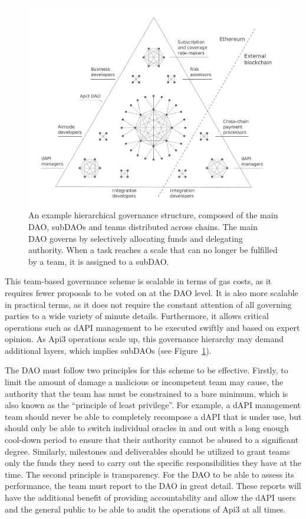 \documentclass[11pt]{article}
\begin{document}
\begin{figure}[t]
    \centering
	\includegraphics[width=\textwidth]{fig/dao/dao}
	\caption{An example hierarchical governance structure, composed of the main DAO, subDAOs and teams distributed across chains.
	The main DAO governs by selectively allocating funds and delegating authority.
	When a task reaches a scale that can no longer be fulfilled by a team, it is assigned to a subDAO.}
	\label{fig:dao}
\end{figure}

This team-based governance scheme is scalable in terms of gas costs, as it requires fewer proposals to be voted on at the DAO level.
It is also more scalable in practical terms, as it does not require the constant attention of all governing parties to a wide variety of minute details.
Furthermore, it allows critical operations such as dAPI management to be executed swiftly and based on expert opinion.
As Api3 operations scale up, this governance hierarchy may demand additional layers, which implies subDAOs (see Figure~\ref{fig:dao}).

The DAO must follow two principles for this scheme to be effective.
Firstly, to limit the amount of damage a malicious or incompetent team may cause, the authority that the team has must be constrained to a bare minimum, which is also known as the ``principle of least privilege''.
For example, a dAPI management team should never be able to completely recompose a dAPI that is under use, but should only be able to switch individual oracles in and out with a long enough cool-down period to ensure that their authority cannot be abused to a significant degree.
Similarly, milestones and deliverables should be utilized to grant teams only the funds they need to carry out the specific responsibilities they have at the time.
The second principle is transparency.
For the DAO to be able to assess its performance, the team must report to the DAO in great detail.
These reports will have the additional benefit of providing accountability and allow the dAPI users and the general public to be able to audit the operations of Api3 at all times.
\end{document}
